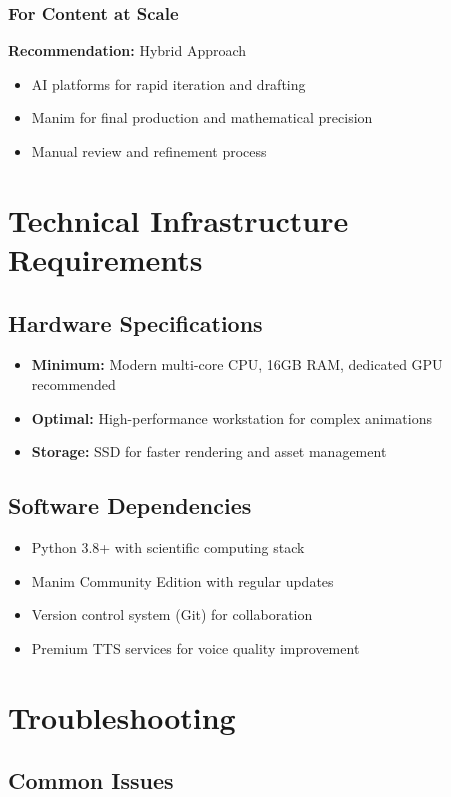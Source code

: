 \documentclass[12pt,a4paper]{article}
\begin{document}
\subsubsection{For Content at Scale}
\textbf{Recommendation:} Hybrid Approach
\begin{itemize}
    \item AI platforms for rapid iteration and drafting
    \item Manim for final production and mathematical precision
    \item Manual review and refinement process
\end{itemize}

\section{Technical Infrastructure Requirements}

\subsection{Hardware Specifications}
\begin{itemize}
    \item \textbf{Minimum:} Modern multi-core CPU, 16GB RAM, dedicated GPU recommended
    \item \textbf{Optimal:} High-performance workstation for complex animations
    \item \textbf{Storage:} SSD for faster rendering and asset management
\end{itemize}

\subsection{Software Dependencies}
\begin{itemize}
    \item Python 3.8+ with scientific computing stack
    \item Manim Community Edition with regular updates
    \item Version control system (Git) for collaboration
    \item Premium TTS services for voice quality improvement
\end{itemize}

\section{Troubleshooting}

\subsection{Common Issues}
\end{document}
